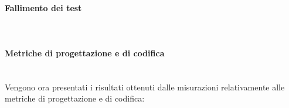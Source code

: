 \paragraph{Fallimento dei test}\mbox{}\\

\paragraph{Metriche di progettazione e di codifica}\mbox{}\\
Vengono ora presentati i risultati ottenuti dalle misurazioni relativamente alle metriche di progettazione e di codifica:
